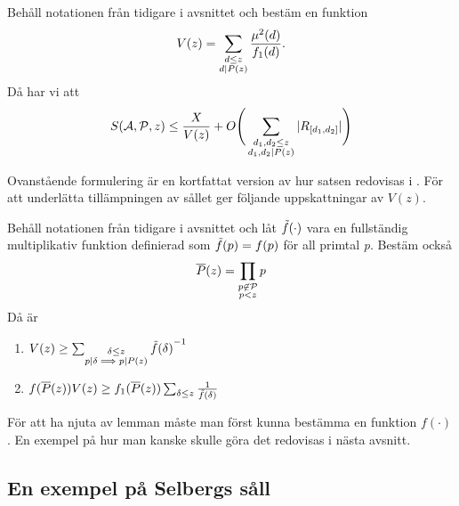 \begin{theorem}\label{thm:SelbergSieve} Behåll notationen från tidigare i avsnittet och bestäm en funktion
\begin{equation}
    V(z) = \sum_{\substack{d\leq z\\ d\divides P(z)}}\frac{\mu^2(d)}{f_1(d)}.\nonumber
\end{equation}
Då har vi att
\begin{equation}
    \S{A}{P}{z} \leq \frac{X}{V(z)} + O\Bigg(\sum_{\substack{d_1,d_2\leq z\\d_1,d_2\divides P(z)}}|R_{[d_1, d_2]}|\Bigg)\nonumber
\end{equation}
\end{theorem}
Ovanstående formulering är en kortfattat version av hur satsen redovisas i \cite{cojocarumurty}. För att underlätta tillämpningen av sållet ger \cite{cojocarumurty} följande uppskattningar av \(V(z)\).
\begin{lemma}[Uppskattningar av \(V(z)\)]\label{thm:SelVApp}
Behåll notationen från tidigare i avsnittet och låt \(\Tilde{f}(\cdot)\) vara en fullständig multiplikativ funktion definierad som \(\Tilde{f}(p) = f(p)\) för all primtal \textit{p}. Bestäm också
\begin{equation}
    \overline{P}(z) = \prod_{\substack{p\not\in\P\\p<z}} p\nonumber
\end{equation}
Då är
\begin{enumerate}
    \item \(
         V(z) \geq \sum_{\substack{\delta\leq z\\p\divides\delta\implies p\divides P(z)}} {\Tilde{f}(\delta)}^{-1}\nonumber\)
    \item \(
        f(\overline{P}(z))V(z) \geq f_1(\overline{P}(z))\sum_{\delta \leq z}\frac{1}{\Tilde{f}(\delta)}\nonumber
    \)
\end{enumerate}
\end{lemma}
För att ha njuta av lemman måste man först kunna bestämma en funktion \(f(\cdot)\). En exempel på hur man kanske skulle göra det redovisas i nästa avsnitt.
\subsection{En exempel på Selbergs såll}